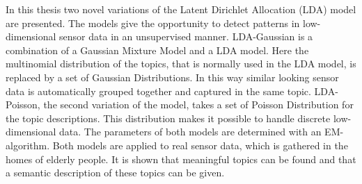 In this thesis two novel variations of the Latent Dirichlet Allocation (LDA) model are presented. The models give the opportunity to detect patterns in low-dimensional sensor data in an unsupervised manner. LDA-Gaussian is a combination of a Gaussian Mixture Model and a LDA model. Here the multinomial distribution of the topics, that is normally used in the LDA model, is replaced by a set of Gaussian Distributions. In this way similar looking sensor data is automatically grouped together and captured in the same topic.
LDA-Poisson, the second variation of the model, takes a set of Poisson Distribution for the topic descriptions. This distribution makes it possible to handle discrete low-dimensional data. The parameters of both models are determined with an EM-algorithm.
Both models are applied to real sensor data, which is gathered in the homes of elderly people. It is shown that meaningful topics can be found and that a semantic description of these topics can be given.